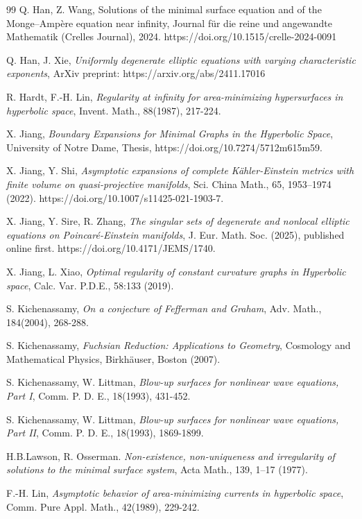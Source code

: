 \documentclass[11pt,reqno]{amsart}
\theoremstyle{definition}
\numberwithin{equation}{section}
\begin{document}
\begin{thebibliography}{99}
 Q. Han, Z. Wang, {Solutions of the minimal surface equation and of the Monge–Ampère equation near infinity}, Journal für die reine und angewandte Mathematik (Crelles Journal), 2024. https://doi.org/10.1515/crelle-2024-0091


 Q. Han, J. Xie,
{\it Uniformly degenerate elliptic equations with varying characteristic exponents}, 
ArXiv preprint: https://arxiv.org/abs/2411.17016


 R. Hardt, F.-H. Lin, \emph{Regularity at infinity 
for area-minimizing hypersurfaces in hyperbolic space}, Invent. Math., 88(1987), 217-224. 

X. Jiang, {\it Boundary Expansions for Minimal Graphs in the Hyperbolic Space}, University of Notre Dame, Thesis, https://doi.org/10.7274/5712m615m59.

X. Jiang, Y. Shi, {\it Asymptotic expansions of complete Kähler-Einstein metrics with finite volume on quasi-projective manifolds}, Sci. China Math., 65, 1953–1974 (2022). https://doi.org/10.1007/s11425-021-1903-7.

X. Jiang, Y. Sire, R. Zhang, {\it
The singular sets of degenerate and nonlocal elliptic equations on Poincaré-Einstein manifolds},
J. Eur. Math. Soc. (2025), published online first. https://doi.org/10.4171/JEMS/1740.

X. Jiang, L. Xiao, {\it Optimal regularity of constant curvature graphs in Hyperbolic space},
Calc. Var. P.D.E., 58:133 (2019).

S. Kichenassamy, {\it On a conjecture of Fefferman and Graham},
Adv. Math., 184(2004), 268-288.

S. Kichenassamy, {\it Fuchsian Reduction: Applications to Geometry},
Cosmology and Mathematical Physics, Birkh\"auser, Boston (2007).

 S. Kichenassamy, W. Littman,
{\it Blow-up surfaces for nonlinear wave equations, Part I},
Comm. P. D. E., 18(1993), 431-452. 


 S. Kichenassamy, W. Littman, 
{\it Blow-up surfaces for nonlinear wave equations, Part II},
Comm. P. D. E., 18(1993), 1869-1899.

H.B.Lawson, R. Osserman. {\it Non-existence, non-uniqueness and irregularity of solutions to the minimal surface system}, Acta Math., 139, 1–17 (1977). 

 F.-H. Lin, \emph{Asymptotic behavior of area-minimizing 
currents in hyperbolic space}, Comm. Pure Appl. Math., 42(1989), 229-242. 


\end{thebibliography}
\end{document}
